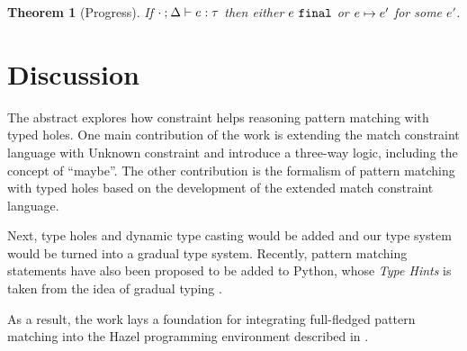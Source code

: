 \documentclass[acmsmall,screen,review,nonacm]{acmart}
\theoremstyle{slplain}
\newtheorem{thm}{Theorem}  %
\numberwithin{thm}{section}
\begin{document}
\begin{thm}[Progress]
 \label{thrm:progress}
 If $\cdot \mathbin{;} \Delta \vdash e : \tau$ then either $e ~\mathtt{final}$ or $e \mapsto e'$ for some $e'$.
\end{thm}

\section{Discussion}
The abstract explores how constraint helps reasoning pattern matching with typed holes.
One main contribution of the work is extending the match constraint language \cite{Harper2012} with Unknown constraint and introduce a three-way logic, including the concept of ``maybe''. The other contribution is the formalism of pattern matching with typed holes based on the development of the extended match constraint language.

Next, type holes and dynamic type casting would be added and our type system would be turned into a gradual type system.
Recently, pattern matching statements have also been proposed to be added to \textsf{Python}, whose \emph{Type Hints} is taken from the idea of gradual typing \cite{pep484,pep622,Siek2006}.

As a result, the work lays a foundation for integrating full-fledged pattern matching into the \textsf{Hazel} programming environment described in \citet{DBLP:journals/pacmpl/OmarVCH19}.

\clearpage



\end{document}
